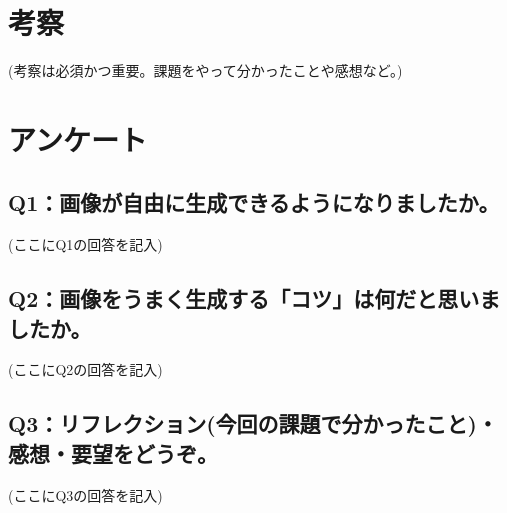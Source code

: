\documentclass[12pt,a4j]{jarticle}
\begin{document}
\section{考察}

(考察は必須かつ重要。課題をやって分かったことや感想など。)

\section{アンケート}

\subsection{Q1：画像が自由に生成できるようになりましたか。}

(ここにQ1の回答を記入)

\subsection{Q2：画像をうまく生成する「コツ」は何だと思いましたか。}

(ここにQ2の回答を記入)

\subsection{Q3：リフレクション(今回の課題で分かったこと)・感想・要望をどうぞ。}

(ここにQ3の回答を記入)
\end{document}
